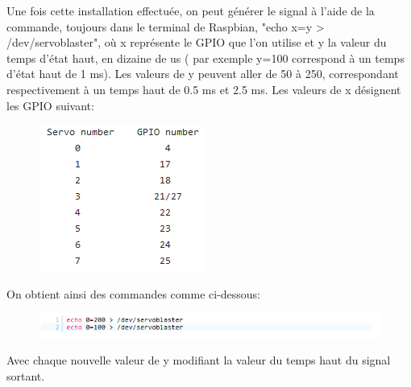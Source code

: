 \documentclass[a4paper,11pt]{report}
\begin{document}
				Une fois cette installation effectuée, on peut générer le signal à l'aide de la commande, toujours dans le terminal de Raspbian, "echo x=y > /dev/servoblaster", où x représente le GPIO que l'on utilise et y la valeur du temps d'état haut, en dizaine de us ( par exemple y=100 correspond à un temps d'état haut de 1 ms). Les valeurs de y peuvent aller de 50 à 250, correspondant respectivement à un temps haut de 0.5 ms et 2.5 ms. \newpage Les valeurs de x désignent les GPIO suivant:
					\begin{figure}[!h]
				  \begin{center}
				  	\includegraphics[scale=1]{Photos/gpio}
				  \end{center}
		  	\end{figure}
				
				On obtient ainsi des commandes comme ci-dessous:
				
					\begin{figure}[!h]
				  \begin{center}
				  	\includegraphics[scale=1]{Photos/sb}
				  \end{center}
		  	\end{figure}
			
			Avec chaque nouvelle valeur de y modifiant la valeur du temps haut du signal sortant. \newline
			
\end{document}
